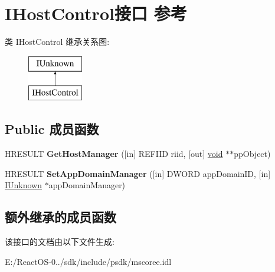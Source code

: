 \hypertarget{interface_i_host_control}{}\section{I\+Host\+Control接口 参考}
\label{interface_i_host_control}
类 I\+Host\+Control 继承关系图\+:\begin{figure}[H]
\begin{center}
\leavevmode
\includegraphics[height=2.000000cm]{interface_i_host_control}
\end{center}
\end{figure}
\subsection*{Public 成员函数}
\begin{DoxyCompactItemize}
\item 
\mbox{\label{interface_i_host_control_a00c0f5b87f55422194d8786090a1dc7e}} 
H\+R\+E\+S\+U\+LT {\bfseries Get\+Host\+Manager} (\mbox{[}in\mbox{]} R\+E\+F\+I\+ID riid, \mbox{[}out\mbox{]} \hyperlink{interfacevoid}{void} $\ast$$\ast$pp\+Object)
\item 
\mbox{\label{interface_i_host_control_ad211380b43c7e534a3a4eaf97b284213}} 
H\+R\+E\+S\+U\+LT {\bfseries Set\+App\+Domain\+Manager} (\mbox{[}in\mbox{]} D\+W\+O\+RD app\+Domain\+ID, \mbox{[}in\mbox{]} \hyperlink{interface_i_unknown}{I\+Unknown} $\ast$app\+Domain\+Manager)
\end{DoxyCompactItemize}
\subsection*{额外继承的成员函数}


该接口的文档由以下文件生成\+:\begin{DoxyCompactItemize}
\item 
E\+:/\+React\+O\+S-\/0../sdk/include/psdk/mscoree.\+idl\end{DoxyCompactItemize}
